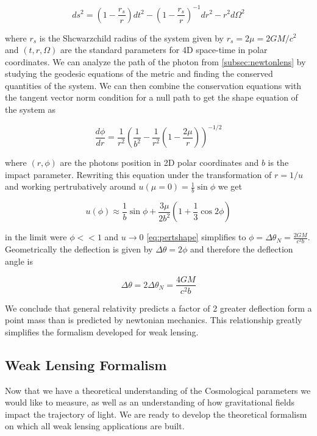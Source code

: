 \begin{equation}
  ds^2 = \left ( 1-\frac{r_s}{r} \right )  dt^2 - \left( 1-\frac{r_s}{r}\right) ^{-1} dr^2 -r^2 d\Omega^2
  \label{schwarz}
\end{equation}

where $r_s$ is the Shcwarzchild radius of the system given by $r_s=2 \mu = 2GM/c^2$ and $(t,r,\Omega)$ are the standard parameters for 4D space-time in polar coordinates. We can analyze the path of the photon from \autoref{subsec:newtonlens} by studying the geodesic equations of the metric and finding the conserved
quantities of the system. We can then combine the conservation equations with the tangent vector norm condition for a 
null path to get the shape equation of the system as 

\begin{equation}
  \frac{d\phi}{dr} = \frac{1}{r^2} \left(\frac{1}{b^2}- \frac{1}{r^2} \left(1-\frac{2\mu}{r}\right) \right)^{-1/2}
  \label{shapeeqbend}
\end{equation}

where $(r,\phi)$ are the photons position in 2D polar coordinates and $b$ is the impact parameter. Rewriting this equation
under the transformation of $r = 1/u$ and working pertrubatively around $u(\mu =0) = \frac{1}{b}\sin \phi
$ we get 

\begin{equation}
  u(\phi) \approx \frac{1}{b}\sin \phi + \frac{3\mu}{2b^2} \left(1+\frac{1}{3}\cos 2 \phi \right)
  \label{eq:pertshape}
\end{equation}

in the limit were $\phi << 1$ and $u \rightarrow 0$ \autoref{eq:pertshape} simplifies to $\phi = \Delta \theta_N =\frac{2GM}{c^2b} $. Geometrically the deflection is given by $\Delta \theta = 2\phi$ and therefore the deflection angle is

\begin{equation}
  \Delta \theta = 2\Delta \theta_N=\frac{4GM}{c^2b}
  \label{grbend}
\end{equation}

We conclude that general relativity predicts a factor of 2 greater deflection form a point mass than is predicted by newtonian mechanics. This relationship greatly simplifies the formalism developed for weak lensing. 

\subsection{Weak Lensing Formalism}
Now that we have a theoretical understanding of the Cosmological parameters we would like to measure, as well as an understanding of how gravitational fields impact the trajectory of light. We are ready to develop the theoretical formalism on which all weak lensing applications are built. 

